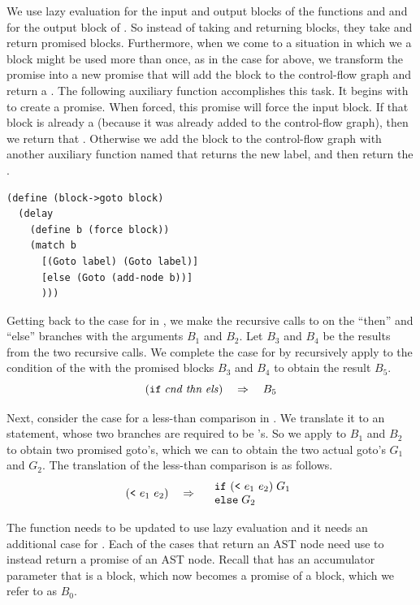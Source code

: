 \documentclass[11pt]{book}
\begin{document}
We use lazy evaluation for the input and output blocks of the
functions  and  and for
the output block of . So instead of taking and
returning blocks, they take and return promised blocks. Furthermore,
when we come to a situation in which we a block might be used more
than once, as in the case for  above, we transform the
promise into a new promise that will add the block to the control-flow
graph and return a .  The following auxiliary function
accomplishes this task. It begins with  to create a
promise. When forced, this promise will force the input block. If that
block is already a  (because it was already added to the
control-flow graph), then we return that . Otherwise we add
the block to the control-flow graph with another auxiliary function
named  that returns the new label, and then return the
.
\begin{lstlisting}
(define (block->goto block)
  (delay
    (define b (force block))
    (match b
      [(Goto label) (Goto label)]
      [else (Goto (add-node b))]
      )))
\end{lstlisting}

Getting back to the case for  in , we
make the recursive calls to  on the ``then'' and
``else'' branches with the arguments  $B_1$\code{)}
and  $B_2$\code{)}. Let $B_3$ and $B_4$ be the
results from the two recursive calls.  We complete the case for
 by recursively apply  to the condition
of the  with the promised blocks $B_3$ and $B_4$ to obtain
the result $B_5$.
\[
(\texttt{if}\; \mathit{cnd}\; \mathit{thn}\; \mathit{els})
\quad\Rightarrow\quad
B_5
\]

Next, consider the case for a less-than comparison in
. We translate it to an  statement,
whose two branches are required to be 's.  So we apply
 to $B_1$ and $B_2$ to obtain two promised goto's,
which we can  to obtain the two actual goto's $G_1$ and
$G_2$. The translation of the less-than comparison is as follows.
\[
(\texttt{<}~e_1~e_2) \quad\Rightarrow\quad
\begin{array}{l}
\texttt{if}~(\texttt{<}~e_1~e_2) \; G_1\\
\texttt{else} \; G_2
\end{array}
\]

The  function needs to be updated to use lazy
evaluation and it needs an additional case for .  Each of the
cases that return an AST node need use  to instead return
a promise of an AST node. Recall that  has an
accumulator parameter that is a block, which now becomes a promise of
a block, which we refer to as $B_0$.
\end{document}
